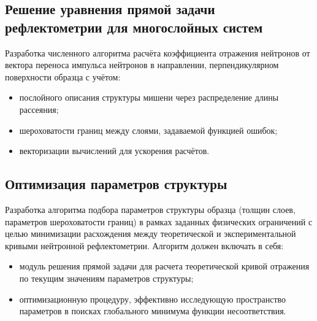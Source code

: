 \documentclass[a4paper]{article}
\begin{document}
\subsection{Решение уравнения прямой задачи рефлектометрии для многослойных систем}
Разработка численного алгоритма расчёта коэффициента отражения нейтронов от вектора переноса импульса нейтронов в направлении, перпендикулярном поверхности образца с учётом:
\begin{itemize} 
\item послойного описания структуры мишени через распределение длины рассеяния;
\item шероховатости границ между слоями, задаваемой функцией ошибок;
\item векторизации вычислений для ускорения расчётов.
\end{itemize}

\subsection{Оптимизация параметров структуры}
Разработка алгоритма подбора параметров структуры образца (толщин слоев, параметров шероховатости границ) в рамках заданных физических ограничений с целью минимизации расхождения между теоретической и экспериментальной кривыми нейтронной рефлектометрии. Алгоритм должен включать в себя:
\begin{itemize} 
\item модуль решения прямой задачи для расчета теоретической кривой отражения по текущим значениям параметров структуры;
\item оптимизационную процедуру, эффективно исследующую пространство параметров в поисках глобального минимума функции несоответствия.
\end{itemize} 
\end{document}
